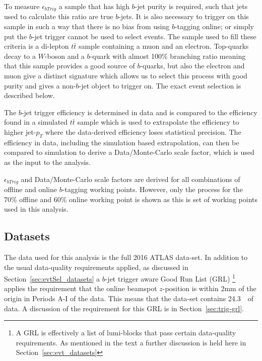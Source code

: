 To measure $\epsilon_{bTrig}$ a sample that has high $b$-jet purity is required,
such that jets used to calculate this ratio are true $b$-jets.
It is also necessary to trigger on this sample in such a way that there is no bias from using $b$-tagging online;
or simply put the $b$-jet trigger cannot be used to select events.
The sample used to fill these criteria is a di-lepton $t\bar{t}$ sample containing a muon and an electron.
Top-quarks decay to a $W$-boson and a $b$-quark with almost 100\% branching ratio meaning that this sample provides a good source of $b$-quarks,
but also the electron and muon give a distinct signature which allows us to select this process with good purity and gives a non-$b$-jet object to trigger on.
The exact event selection is described below. 

The $b$-jet trigger efficiency is determined in data and is compared to the efficiency found in a 
simulated $t\bar{t}$ sample which is used to extrapolate the efficiency to 
higher jet-$p_T$ where the data-derived efficiency loses statistical precision.
The efficiency in data, including the simulation based extrapolation, can then be
compared to simulation to derive a Data/Monte-Carlo scale factor, which is used as the input to the analysis.


$\epsilon_{bTrig}$ and Data/Monte-Carlo scale factors are derived for all combinations of offline and online $b$-tagging working points.
However, only the process for the 70\% offline and 60\% online working point is shown
as this is set of working points used in this analysis.

\subsection{Datasets}
The data used for this analysis is the full 2016 ATLAS data-set.
In addition to the usual data-quality requirements applied,
as discussed in Section~\ref{sec:evtSel_datasets}
a $b$-jet trigger aware Good Run List (GRL)
\footnote{A GRL is effectively a list of lumi-blocks that pass certain data-quality requirements.
 As mentioned in the text a further discussion is held here in Section~\ref{sec:evt_datasets}}
applies the requirement that the online beamspot $z$-position is within 2mm of the origin in Periods A-I of the data.
This means that the data-set contains 24.3~\ifb~of data.
A discussion of the requirement for this GRL is in Section~\ref{sec:trig-grl}. 


